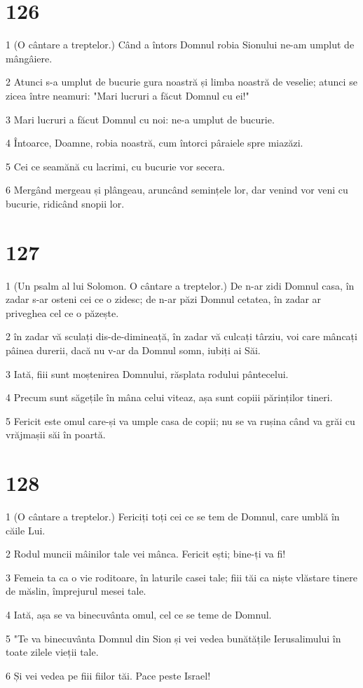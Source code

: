 \chapter{126}

\par 1 (O cântare a treptelor.) Când a întors Domnul robia Sionului ne-am umplut de mângâiere.
\par 2 Atunci s-a umplut de bucurie gura noastră și limba noastră de veselie; atunci se zicea între neamuri: "Mari lucruri a făcut Domnul cu ei!"
\par 3 Mari lucruri a făcut Domnul cu noi: ne-a umplut de bucurie.
\par 4 Întoarce, Doamne, robia noastră, cum întorci pâraiele spre miazăzi.
\par 5 Cei ce seamănă cu lacrimi, cu bucurie vor secera.
\par 6 Mergând mergeau și plângeau, aruncând semințele lor, dar venind vor veni cu bucurie, ridicând snopii lor.

\chapter{127}

\par 1 (Un psalm al lui Solomon. O cântare a treptelor.) De n-ar zidi Domnul casa, în zadar s-ar osteni cei ce o zidesc; de n-ar păzi Domnul cetatea, în zadar ar priveghea cel ce o păzește.
\par 2 în zadar vă sculați dis-de-dimineață, în zadar vă culcați târziu, voi care mâncați pâinea durerii, dacă nu v-ar da Domnul somn, iubiți ai Săi.
\par 3 Iată, fiii sunt moștenirea Domnului, răsplata rodului pântecelui.
\par 4 Precum sunt săgețile în mâna celui viteaz, așa sunt copiii părinților tineri.
\par 5 Fericit este omul care-și va umple casa de copii; nu se va rușina când va grăi cu vrăjmașii săi în poartă.

\chapter{128}

\par 1 (O cântare a treptelor.) Fericiți toți cei ce se tem de Domnul, care umblă în căile Lui.
\par 2 Rodul muncii mâinilor tale vei mânca. Fericit ești; bine-ți va fi!
\par 3 Femeia ta ca o vie roditoare, în laturile casei tale; fiii tăi ca niște vlăstare tinere de măslin, împrejurul mesei tale.
\par 4 Iată, așa se va binecuvânta omul, cel ce se teme de Domnul.
\par 5 "Te va binecuvânta Domnul din Sion și vei vedea bunătățile Ierusalimului în toate zilele vieții tale.
\par 6 Și vei vedea pe fiii fiilor tăi. Pace peste Israel!

